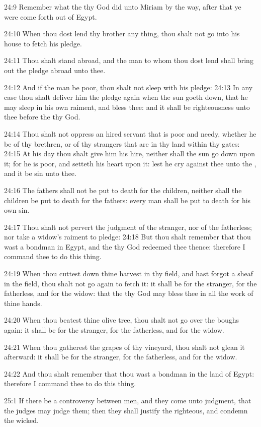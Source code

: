 24:9 Remember what the \LORD thy God did unto Miriam by the way, after
that ye were come forth out of Egypt.

24:10 When thou dost lend thy brother any thing, thou shalt not go
into his house to fetch his pledge.

24:11 Thou shalt stand abroad, and the man to whom thou dost lend
shall bring out the pledge abroad unto thee.

24:12 And if the man be poor, thou shalt not sleep with his pledge:
24:13 In any case thou shalt deliver him the pledge again when the sun
goeth down, that he may sleep in his own raiment, and bless thee: and
it shall be righteousness unto thee before the \LORD thy God.

24:14 Thou shalt not oppress an hired servant that is poor and needy,
whether he be of thy brethren, or of thy strangers that are in thy
land within thy gates: 24:15 At his day thou shalt give him his hire,
neither shall the sun go down upon it; for he is poor, and setteth his
heart upon it: lest he cry against thee unto the \LORD, and it be sin
unto thee.

24:16 The fathers shall not be put to death for the children, neither
shall the children be put to death for the fathers: every man shall be
put to death for his own sin.

24:17 Thou shalt not pervert the judgment of the stranger, nor of the
fatherless; nor take a widow's raiment to pledge: 24:18 But thou shalt
remember that thou wast a bondman in Egypt, and the \LORD thy God
redeemed thee thence: therefore I command thee to do this thing.

24:19 When thou cuttest down thine harvest in thy field, and hast
forgot a sheaf in the field, thou shalt not go again to fetch it: it
shall be for the stranger, for the fatherless, and for the widow: that
the \LORD thy God may bless thee in all the work of thine hands.

24:20 When thou beatest thine olive tree, thou shalt not go over the
boughs again: it shall be for the stranger, for the fatherless, and
for the widow.

24:21 When thou gatherest the grapes of thy vineyard, thou shalt not
glean it afterward: it shall be for the stranger, for the fatherless,
and for the widow.

24:22 And thou shalt remember that thou wast a bondman in the land of
Egypt: therefore I command thee to do this thing.

25:1 If there be a controversy between men, and they come unto
judgment, that the judges may judge them; then they shall justify the
righteous, and condemn the wicked.

